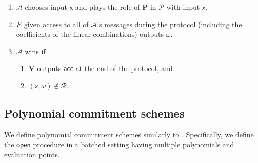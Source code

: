 \documentclass[11pt]{article} %
\newcommand{\adv}{\ensuremath{\mathcal A}\xspace}
\newcommand{\open}{\ensuremath{\mathsf{open}}\xspace}
\newcommand{\acc}{\ensuremath{\mathsf{acc}}\xspace}
\newcommand{\prv}{\ensuremath{\mathsf{\mathbf{P}}}\xspace}
\newcommand{\inp}{\ensuremath{\mathsf{x}}\xspace}
\newcommand{\wit}{\ensuremath{\omega}\xspace}
\newcommand{\ver}{\ensuremath{\mathsf{\mathbf{V}}}\xspace}
\newcommand{\rel}{\ensuremath{\mathcal{R}}\xspace}
\newcommand{\ext}{\ensuremath{E}\xspace}
\newcommand{\prot}{\ensuremath{\mathscr{P}}\xspace}
\begin{document}
\begin{enumerate}
 \item \adv chooses input \inp and plays the role of \prv in \prot with input \inp.
 \item \ext given access to all of \adv's messages during the protocol (including the coefficients of the linear combinations) outputs \wit.
 \item \adv wins if 
 \begin{enumerate}
  \item \ver outputs \acc at the end of the protocol, and 
  \item $(\inp,\wit)\notin \rel$.
 \end{enumerate}

\end{enumerate}

\subsection{Polynomial commitment schemes}
We define polynomial commitment schemes similarly to \cite{plonk}.
Specifically, we define the \open procedure in a batched setting having multiple polynomials and evaluation points.
\end{document}
